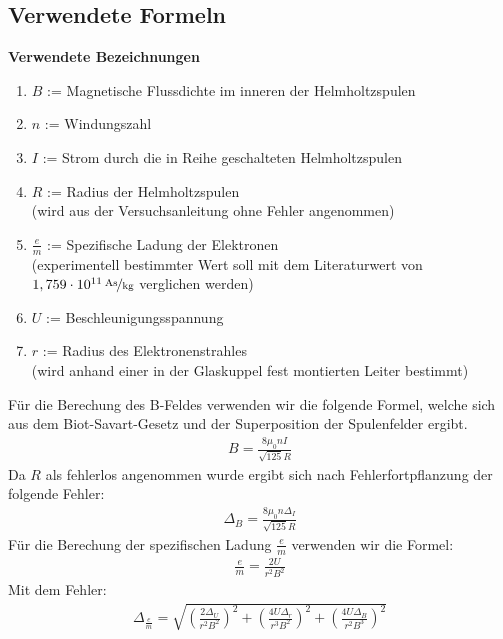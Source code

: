 \documentclass[12pt,a4paper]{article}
\begin{document}
\subsection{Verwendete Formeln}
\textbf{Verwendete Bezeichnungen}
\begin{enumerate}
\item $B$ := Magnetische Flussdichte im inneren der Helmholtzspulen
\item $n$ := Windungszahl
\item $I$ := Strom durch die in Reihe geschalteten Helmholtzspulen
\item $R$ := Radius der Helmholtzspulen\\
(wird aus der Versuchsanleitung ohne Fehler angenommen)
\item $\frac{e}{m}$ := Spezifische Ladung der Elektronen\\
(experimentell bestimmter Wert soll mit dem Literaturwert von $\unitfrac[1,759\cdot10^{11}]{As}{kg}$ verglichen werden)
\item $U$ := Beschleunigungsspannung
\item $r$ := Radius des Elektronenstrahles\\
(wird anhand einer in der Glaskuppel fest montierten Leiter bestimmt)
\end{enumerate}
Für die Berechung des B-Feldes verwenden wir die folgende Formel, welche sich aus dem Biot-Savart-Gesetz und der Superposition der Spulenfelder ergibt.
\begin{align}
B = \frac{8\mu_0 n I}{\sqrt{125} R}
\label{eqn:b}
\end{align}
Da $R$ als fehlerlos angenommen wurde ergibt sich nach Fehlerfortpflanzung der folgende Fehler:
\begin{align}
\Delta_B = \frac{8\mu_0 n \Delta_I}{\sqrt{125} R}
\label{eqn:b_delta}
\end{align}
Für die Berechung der spezifischen Ladung $\frac{e}{m}$ verwenden wir die Formel:
\begin{align}
\frac{e}{m} = \frac{2U}{r^2B^2}
\label{eqn:e/m}
\end{align}
Mit dem Fehler:
\begin{align}
\Delta_{\frac{e}{m}} = \sqrt{
\left(\frac{2\Delta_U}{r^2B^2}\right)^2+
\left(\frac{4U\Delta_r}{r^3B^2}\right)^2+
\left(\frac{4U\Delta_B}{r^2B^3}\right)^2}
\label{eqn:e/m_delta}
\end{align}
\end{document}
